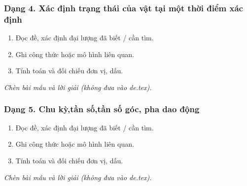 \subsubsection{Dạng 4. Xác định trạng thái của vật tại một thời điểm xác định}
\begin{phuongphap}
\begin{enumerate}
\item Đọc đề, xác định đại lượng đã biết / cần tìm.
\item Ghi công thức hoặc mô hình liên quan.
\item Tính toán và đối chiếu đơn vị, dấu.
\end{enumerate}
\end{phuongphap}
\begin{vidumau}
\textit{Chèn bài mẫu và lời giải (không đưa vào de.tex).}
\end{vidumau}

\subsubsection{Dạng 5. Chu kỳ,tần số,tần số góc, pha dao động}
\begin{phuongphap}
\begin{enumerate}
\item Đọc đề, xác định đại lượng đã biết / cần tìm.
\item Ghi công thức hoặc mô hình liên quan.
\item Tính toán và đối chiếu đơn vị, dấu.
\end{enumerate}
\end{phuongphap}
\begin{vidumau}
\textit{Chèn bài mẫu và lời giải (không đưa vào de.tex).}
\end{vidumau}


